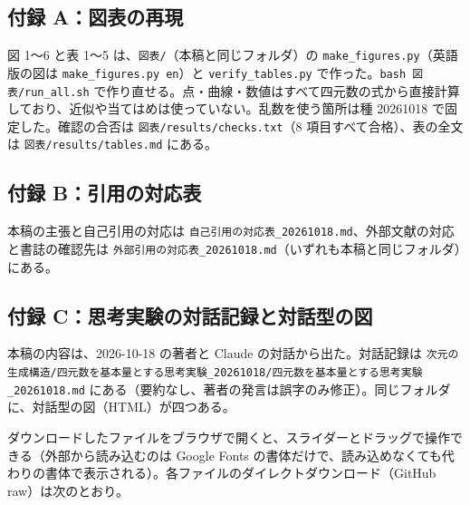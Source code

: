\documentclass[
  a4paper,
]{ltjsarticle}
\begin{document}
\subsection{付録
A：図表の再現}\label{ux4ed8ux9332-aux56f3ux8868ux306eux518dux73fe}

図 1〜6 と表 1〜5 は、\texttt{図表/\allowbreak{}}（本稿と同じフォルダ）の
\texttt{make\_\allowbreak{}figures.py}（英語版の図は
\texttt{make\_\allowbreak{}figures.py\ en}）と \texttt{verify\_\allowbreak{}tables.py}
で作った。\texttt{bash\ 図表/\allowbreak{}run\_\allowbreak{}all.sh}
で作り直せる。点・曲線・数値はすべて四元数の式から直接計算しており、近似や当てはめは使っていない。乱数を使う箇所は種
20261018 で固定した。確認の合否は \texttt{図表/\allowbreak{}results/\allowbreak{}checks.txt}（8
項目すべて合格）、表の全文は \texttt{図表/\allowbreak{}results/\allowbreak{}tables.md} にある。

\subsection{付録
B：引用の対応表}\label{ux4ed8ux9332-bux5f15ux7528ux306eux5bfeux5fdcux8868}

本稿の主張と自己引用の対応は
\texttt{自己引用の対応表\_\allowbreak{}20261018.md}、外部文献の対応と書誌の確認先は
\texttt{外部引用の対応表\_\allowbreak{}20261018.md}（いずれも本稿と同じフォルダ）にある。

\subsection{付録
C：思考実験の対話記録と対話型の図}\label{ux4ed8ux9332-cux601dux8003ux5b9fux9a13ux306eux5bfeux8a71ux8a18ux9332ux3068ux5bfeux8a71ux578bux306eux56f3}

本稿の内容は、2026-10-18 の著者と Claude の対話から出た。対話記録は
\texttt{次元の生成構造/\allowbreak{}四元数を基本量とする思考実験\_\allowbreak{}20261018/\allowbreak{}四元数を基本量とする思考実験\_\allowbreak{}20261018.md}
にある（要約なし、著者の発言は誤字のみ修正）。同じフォルダに、対話型の図（HTML）が四つある。

ダウンロードしたファイルをブラウザで開くと、スライダーとドラッグで操作できる（外部から読み込むのは
Google Fonts
の書体だけで、読み込めなくても代わりの書体で表示される）。各ファイルのダイレクトダウンロード（GitHub
raw）は次のとおり。
\end{document}

